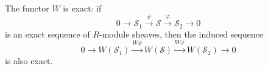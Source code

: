 The functor $W$ is exact: if
$$0 \to \mathcal{S}_1 \xrightarrow{\psi} \mathcal{S} \xrightarrow{\varphi} \mathcal{S}_2 \to 0$$
is an exact sequence of $R$-module sheaves, then the induced sequence
$$0 \to W(\mathcal{S}_1) \xrightarrow{W\psi} W(\mathcal{S}) \xrightarrow{W\varphi} W(\mathcal{S}_2) \to 0$$
is also exact.
